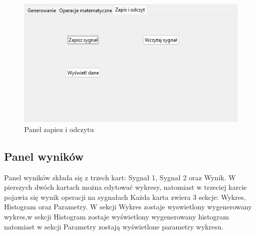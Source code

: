\documentclass{article}
\begin{document}
\begin{figure}[h!]
    \centering
    \includegraphics[width=\textwidth]{img/zapis.png}
    \caption{Panel zapisu i odczytu}
\end{figure}

\FloatBarrier
\subsection{Panel wyników} 

Panel wyników składa się z trzech kart: Sygnał 1, Sygnał 2 oraz Wynik. W pierszych dwóch kartach można
edytować wykresy, natomiast w trzeciej karcie pojawia się wynik operacji na sygnałach
Każda karta zwiera 3 sekcje: Wykres, Histogram oraz Parametry. W sekcji Wykres zostaje wyswietlony wygenerowany
wykres,w sekcji Histogram zostaje wyświetlony wygenerowany histogram natomiast w sekcji Parametry 
zostają wyświetlone parametry wykresu.
\end{document}
